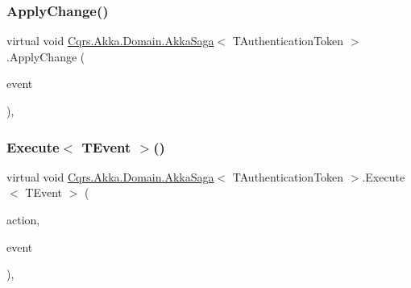 \mbox{\label{classCqrs_1_1Akka_1_1Domain_1_1AkkaSaga_a18d554cd5ad329ab152efb7d852f2438_a18d554cd5ad329ab152efb7d852f2438}} 
\subsubsection{\texorpdfstring{Apply\+Change()}{ApplyChange()}\hspace{0.1cm}{\footnotesize\ttfamily [2/2]}}
{\footnotesize\ttfamily virtual void \hyperlink{classCqrs_1_1Akka_1_1Domain_1_1AkkaSaga}{Cqrs.\+Akka.\+Domain.\+Akka\+Saga}$<$ T\+Authentication\+Token $>$.Apply\+Change (\begin{DoxyParamCaption}\item[{\hyperlink{interfaceCqrs_1_1Events_1_1IEvent}{I\+Event}$<$ T\+Authentication\+Token $>$ @}]{event }\end{DoxyParamCaption})\hspace{0.3cm}{\ttfamily [protected]}, {\ttfamily [virtual]}}

\mbox{\label{classCqrs_1_1Akka_1_1Domain_1_1AkkaSaga_ac0782ac0b7e28418a52cead1b7b8b0c3_ac0782ac0b7e28418a52cead1b7b8b0c3}} 
\subsubsection{\texorpdfstring{Execute$<$ T\+Event $>$()}{Execute< TEvent >()}}
{\footnotesize\ttfamily virtual void \hyperlink{classCqrs_1_1Akka_1_1Domain_1_1AkkaSaga}{Cqrs.\+Akka.\+Domain.\+Akka\+Saga}$<$ T\+Authentication\+Token $>$.Execute$<$ T\+Event $>$ (\begin{DoxyParamCaption}\item[{Action$<$ T\+Event $>$}]{action,  }\item[{T\+Event @}]{event }\end{DoxyParamCaption})\hspace{0.3cm}{\ttfamily [protected]}, {\ttfamily [virtual]}}

